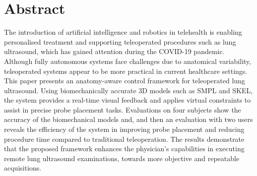 \documentclass[epsfig,a4paper,11pt,titlepage,twoside,openright]{book}
\begin{document}
      
    \chapter*{Abstract} %
    \label{abtract}
    


      The introduction of artificial intelligence and robotics in telehealth is enabling personalised treatment and supporting teleoperated procedures such as lung ultrasound, which has gained attention during the COVID-19 pandemic. Although fully autonomous systems face challenges due to anatomical variability, teleoperated systems appear to be more practical in current healthcare settings. This paper presents an anatomy-aware control framework for teleoperated lung ultrasound. Using biomechanically accurate 3D models such as SMPL and SKEL, the system provides a real-time visual feedback and applies virtual constraints to assist in precise probe placement tasks. Evaluations on four subjects show the accuracy of the biomechanical models and, and then an evaluation with two users reveals the efficiency of the system in improving probe placement and reducing procedure time compared to traditional teleoperation. The results demonstrate that the proposed framework enhances the physician's capabilities in executing remote lung ultrasound examinations, towards more objective and repeatable acquisitions.
      
      
      
      
      
      
      
      
      
      
    \endgroup
\end{document}
